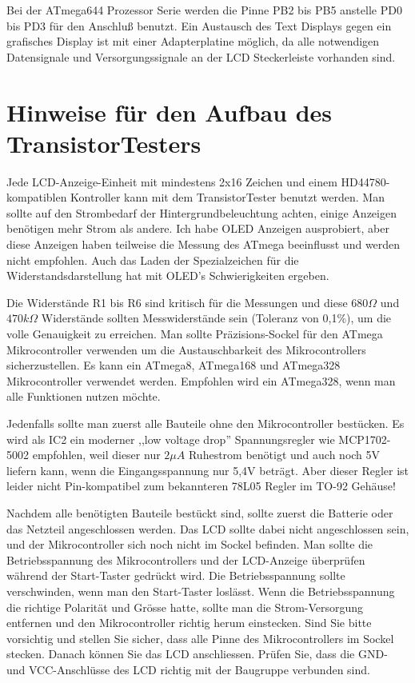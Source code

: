 Bei der ATmega644 Prozessor Serie werden die Pinne PB2 bis PB5 anstelle PD0 bis PD3 für den Anschluß benutzt.
Ein Austausch des Text Displays gegen ein grafisches Display ist mit einer Adapterplatine möglich, da
alle notwendigen Datensignale und Versorgungssignale an der LCD Steckerleiste vorhanden sind.

\section{Hinweise für den Aufbau des TransistorTesters}
Jede LCD-Anzeige-Einheit mit mindestens 2x16 Zeichen und einem HD44780-kompatiblen Kontroller kann mit
dem TransistorTester benutzt werden.
Man sollte auf den Strombedarf der Hintergrundbeleuchtung achten, einige Anzeigen benötigen
mehr Strom als andere.
Ich habe OLED Anzeigen ausprobiert, aber diese Anzeigen haben teilweise die Messung des
ATmega beeinflusst und werden nicht empfohlen. Auch das Laden der Spezialzeichen für die 
Widerstandsdarstellung hat mit OLED's Schwierigkeiten ergeben.

Die Widerstände R1 bis R6 sind kritisch für die Messungen und diese \(680\Omega\) und
\(470k\Omega\) Widerstände sollten Messwiderstände sein (Toleranz von 0,1\%), um 
die volle Genauigkeit zu erreichen.
Man sollte Präzisions-Sockel für den ATmega Mikrocontroller verwenden um
die Austauschbarkeit des Mikrocontrollers sicherzustellen.
Es kann ein ATmega8, ATmega168 und ATmega328 Mikrocontroller verwendet werden.
Empfohlen wird ein ATmega328, wenn man alle Funktionen nutzen möchte.

Jedenfalls sollte man zuerst alle Bauteile ohne den Mikrocontroller bestücken.
Es wird als IC2 ein moderner ,,low voltage drop'' Spannungsregler wie MCP1702-5002 empfohlen, weil
dieser nur \(2\mu A\) Ruhestrom benötigt und auch noch 5V liefern kann, 
 wenn die Eingangsspannung nur 5,4V beträgt.
Aber dieser Regler ist leider nicht Pin-kompatibel zum bekannteren 78L05 Regler im TO-92 Gehäuse!

Nachdem alle benötigten Bauteile bestückt sind, sollte zuerst die Batterie
oder das Netzteil angeschlossen werden. Das LCD sollte dabei nicht angeschlossen sein, und der Mikrocontroller sich noch nicht im Sockel befinden.
Man sollte die Betriebsspannung des Mikrocontrollers und der LCD-Anzeige
überprüfen während der Start-Taster gedrückt wird.
Die Betriebsspannung sollte verschwinden, wenn man den Start-Taster loslässt.
Wenn die Betriebsspannung die richtige Polarität und Grösse hatte,
sollte man die Strom-Versorgung entfernen und den Mikrocontroller 
richtig herum einstecken. Sind Sie bitte vorsichtig und stellen Sie sicher,
dass alle Pinne des Mikrocontrollers im Sockel stecken.
Danach können Sie das LCD anschliessen. Prüfen Sie, dass die GND- und VCC-Anschlüsse des LCD richtig mit der Baugruppe verbunden sind.

